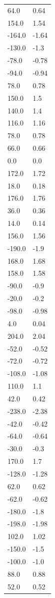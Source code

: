 \begin{longtable}{ll}
64.0 & 0.64 \\
154.0 & 1.54 \\
-164.0 & -1.64 \\
-130.0 & -1.3 \\
-78.0 & -0.78 \\
-94.0 & -0.94 \\
78.0 & 0.78 \\
150.0 & 1.5 \\
140.0 & 1.4 \\
116.0 & 1.16 \\
78.0 & 0.78 \\
66.0 & 0.66 \\
0.0 & 0.0 \\
172.0 & 1.72 \\
18.0 & 0.18 \\
176.0 & 1.76 \\
36.0 & 0.36 \\
14.0 & 0.14 \\
156.0 & 1.56 \\
-190.0 & -1.9 \\
168.0 & 1.68 \\
158.0 & 1.58 \\
-90.0 & -0.9 \\
-20.0 & -0.2 \\
-98.0 & -0.98 \\
4.0 & 0.04 \\
204.0 & 2.04 \\
-52.0 & -0.52 \\
-72.0 & -0.72 \\
-108.0 & -1.08 \\
110.0 & 1.1 \\
42.0 & 0.42 \\
-238.0 & -2.38 \\
-42.0 & -0.42 \\
-64.0 & -0.64 \\
-30.0 & -0.3 \\
170.0 & 1.7 \\
-128.0 & -1.28 \\
62.0 & 0.62 \\
-62.0 & -0.62 \\
-180.0 & -1.8 \\
-198.0 & -1.98 \\
102.0 & 1.02 \\
-150.0 & -1.5 \\
-100.0 & -1.0 \\
88.0 & 0.88 \\
52.0 & 0.52 \\

\end{longtable}
